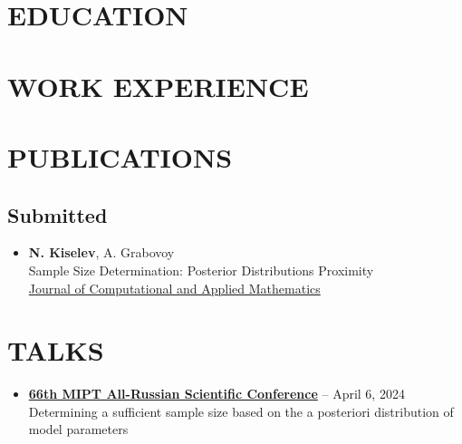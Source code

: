 \documentclass[12pt]{moderncv}
\begin{document}
    \makecvtitle

    \section{EDUCATION}


    \section{WORK EXPERIENCE}


    \section{PUBLICATIONS}

        \subsection{Submitted}

        \begin{itemize}
            \item \textbf{N. Kiselev}, A. Grabovoy\\
            Sample Size Determination: Posterior Distributions Proximity\\
            \href{https://www.sciencedirect.com/journal/journal-of-computational-and-applied-mathematics}{Journal of Computational and Applied Mathematics}
        \end{itemize}

    \section{TALKS}

        \begin{itemize}
            \item \href{https://www.youtube.com/live/WnIRaRl730A?si=q0eScgnDP2ZidCpK&t=1723}{\textbf{66th MIPT All-Russian Scientific Conference}} -- April 6, 2024\\
            Determining a sufficient sample size based on the a posteriori distribution of model parameters
        \end{itemize}
\end{document}
